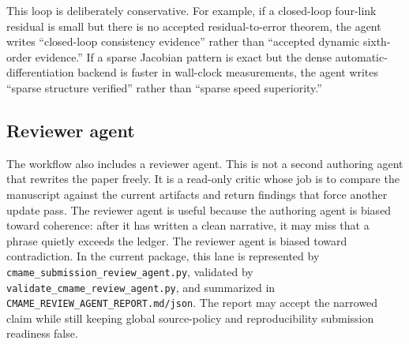 \documentclass[10pt]{article}
\begin{document}
This loop is deliberately conservative. For example, if a closed-loop
four-link residual is small but there is no accepted residual-to-error theorem,
the agent writes ``closed-loop consistency evidence'' rather than ``accepted
dynamic sixth-order evidence.'' If a sparse Jacobian pattern is exact but the
dense automatic-differentiation backend is faster in wall-clock measurements,
the agent writes ``sparse structure verified'' rather than ``sparse speed
superiority.''

\subsection{Reviewer agent}

The workflow also includes a reviewer agent. This is not a second authoring
agent that rewrites the paper freely. It is a read-only critic whose job is to
compare the manuscript against the current artifacts and return findings that
force another update pass. The reviewer agent is useful because the authoring
agent is biased toward coherence: after it has written a clean narrative, it
may miss that a phrase quietly exceeds the ledger. The reviewer agent is
biased toward contradiction. In the current package, this lane is represented
by \texttt{cmame\_submission\_review\_agent.py}, validated by
\texttt{validate\_cmame\_review\_agent.py}, and summarized in
\texttt{CMAME\_REVIEW\_AGENT\_REPORT.md/json}. The report may accept the
narrowed claim while still keeping global source-policy and reproducibility
submission readiness false.
\end{document}
